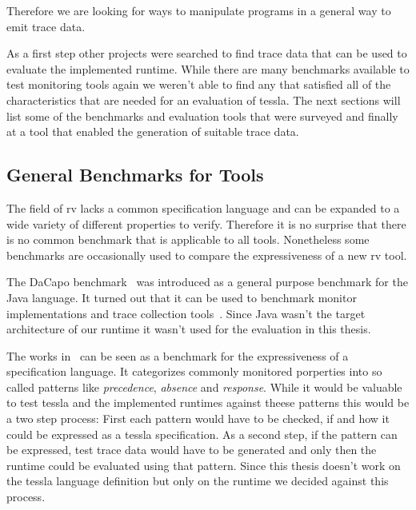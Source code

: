 Therefore we are looking for ways to manipulate programs in a general way to emit trace data.

As a first step other projects were searched to find trace data that can be used to evaluate the implemented runtime.
While there are many benchmarks available to test monitoring tools again we weren't able to find any that satisfied all of the characteristics that are needed for an evaluation of \gls{tessla}.
The next sections will list some of the benchmarks and evaluation tools that were surveyed and finally at a tool that enabled the generation of suitable trace data.

\subsection{General Benchmarks for  Tools}

The field of \gls{rv} lacks a common specification language and can be expanded to a wide variety of different properties to verify.
Therefore it is no surprise that there is no common benchmark that is applicable to all tools.
Nonetheless some benchmarks are occasionally used to compare the expressiveness of a new \gls{rv} tool.

The DaCapo benchmark~\citep{Blackburn2006} was introduced as a general purpose benchmark for the Java language.
It turned out that it can be used to benchmark monitor implementations and trace collection tools~\citep{Wu2016,Chen2007,Marek2012}.
Since Java wasn't the target architecture of our runtime it wasn't used for the evaluation in this thesis.

The works in~\cite{Dwyer1999} can be seen as a benchmark for the expressiveness of a specification language.
It categorizes commonly monitored porperties into so called patterns like \emph{precedence}, \emph{absence} and \emph{response}.
While it would be valuable to test \gls{tessla} and the implemented runtimes against theese patterns this would be a two step process:
First each pattern would have to be checked, if and how it could be expressed as a \gls{tessla} specification.
As a second step, if the pattern can be expressed, test trace data would have to be generated and only then the runtime could be evaluated using that pattern.
Since this thesis doesn't work on the \gls{tessla} language definition but only on the runtime we decided against this process.

